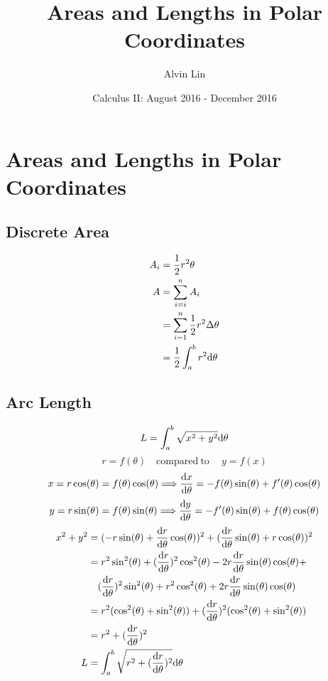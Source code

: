 \documentclass[letterpaper, 12pt]{math}
\title{Areas and Lengths in Polar Coordinates}
\author{Alvin Lin}
\date{Calculus II: August 2016 - December 2016}
\begin{document}
\maketitle

\section*{Areas and Lengths in Polar Coordinates}

\subsection*{Discrete Area}
\begin{center}
\end{center}
\begin{align*}
  A_{i} &= \frac{1}{2}r^{2}\theta \\
  A &= \sum_{i=i}^{n}{A_{i}} \\
  &= \sum_{i=1}^{n}{\frac{1}{2}r^{2}\Delta\theta} \\
  &= \frac{1}{2}\int_{a}^{b}{r^{2}\mathrm{d}{\theta}}
\end{align*}

\subsection*{Arc Length}
\[ L = \int_{a}^{b}{\sqrt{x^{2}+y^{2}}\mathrm{d}{\theta}} \]
\[ r = f(\theta) \quad \mathrm{compared\ to\ } \quad y=f(x) \]
\[ x = r\cos(\theta) = f(\theta)\cos(\theta) \Longrightarrow
   \frac{\mathrm{d}{x}}{\mathrm{d}{\theta}} = -f(\theta)\sin(\theta)+f'(\theta)\cos(\theta) \]
\[ y = r\sin(\theta) = f(\theta)\sin(\theta) \Longrightarrow
   \frac{\mathrm{d}{y}}{\mathrm{d}{\theta}} = -f'(\theta)\sin(\theta)+f(\theta)\cos(\theta) \]
\begin{align*}
  x^{2}+y^{2} &= (-r\sin(\theta)+\frac{\mathrm{d}{r}}{\mathrm{d}{\theta}}\cos(\theta))^{2}
    +(\frac{\mathrm{d}{r}}{\mathrm{d}{\theta}}\sin(\theta)+r\cos(\theta))^{2} \\
  &= r^{2}\sin^{2}(\theta)+(\frac{\mathrm{d}{r}}{\mathrm{d}{\theta}})^{2}\cos^{2}(\theta)-
    2r\frac{\mathrm{d}{r}}{\mathrm{d}{\theta}}\sin(\theta)\cos(\theta)+ \\
  & \quad (\frac{\mathrm{d}{r}}{\mathrm{d}{\theta}})^{2}\sin^{2}(\theta)+r^{2}\cos^{2}(\theta)+
    2r\frac{\mathrm{d}{r}}{\mathrm{d}{\theta}}\sin(\theta)\cos(\theta) \\
  &= r^{2}(\cos^{2}(\theta)+\sin^{2}(\theta))+
    (\frac{\mathrm{d}{r}}{\mathrm{d}{\theta}})^{2}(\cos^{2}(\theta)+\sin^{2}(\theta)) \\
  &= r^{2}+(\frac{\mathrm{d}{r}}{\mathrm{d}{\theta}})^{2} \\
  L &= \int_{a}^{b}{\sqrt{r^{2}+(\frac{\mathrm{d}{r}}{\mathrm{d}{\theta}})^{2}}\mathrm{d}{\theta}}
\end{align*}
\end{document}
